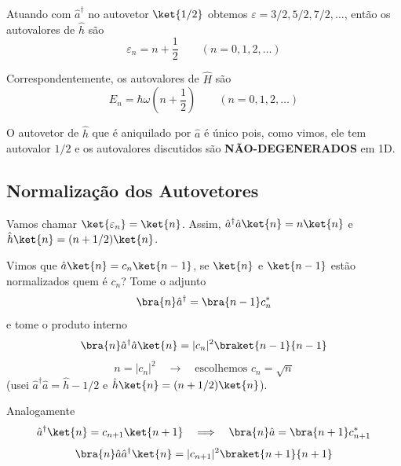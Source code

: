 Atuando com $\hat{a}^\dagger$ no autovetor $\ket{1/2}$ obtemos $\varepsilon = 3/2, 5/2, 7/2, \dots$, então os autovalores de $\hat{h}$ são
\begin{equation}
    \varepsilon_n = n + \frac{1}{2} \qquad (n = 0, 1, 2, \dots)
\label{eq:aula18_eps_n}
\end{equation}

Correspondentemente, os autovalores de $\hat{H}$ são
\begin{equation}
    \boxed{E_n = \hbar\omega\left( n + \frac{1}{2} \right) \qquad (n = 0, 1, 2, \dots)}
\label{eq:aula18_En}
\end{equation}

O autovetor de $\hat{h}$ que é aniquilado por $\hat{a}$ é único pois, como vimos, ele tem autovalor $1/2$ e os autovalores discutidos são \textbf{NÃO-DEGENERADOS} em 1D.

\subsection*{Normalização dos Autovetores}

Vamos chamar $\ket{\varepsilon_n} = \ket{n}$. Assim, $\hat{a}^\dagger\hat{a}\ket{n} = n\ket{n}$ e $\hat{h}\ket{n} = (n+1/2)\ket{n}$.

Vimos que $\hat{a}\ket{n} = c_n \ket{n-1}$, se $\ket{n}$ e $\ket{n-1}$ estão normalizados quem é $c_n$? Tome o adjunto
\begin{equation}
    \bra{n}\hat{a}^\dagger = \bra{n-1}c_n^*
\label{eq:aula18_adjunto_an}
\end{equation}
e tome o produto interno
\begin{equation}
    \bra{n}\hat{a}^\dagger\hat{a}\ket{n} = |c_n|^2 \braket{n-1}{n-1}
\label{eq:aula18_produto_interno_cn}
\end{equation}
\begin{equation}
    n = |c_n|^2 \quad \longrightarrow \quad \text{escolhemos } \boxed{c_n = \sqrt{n}}
\label{eq:aula18_cn}
\end{equation}
(usei $\hat{a}^\dagger\hat{a} = \hat{h} - 1/2$ e $\hat{h}\ket{n} = (n+1/2)\ket{n}$).

Analogamente
\begin{equation}
    \hat{a}^\dagger\ket{n} = c_{n+1}\ket{n+1} \quad \Longrightarrow \quad \bra{n}\hat{a} = \bra{n+1}c_{n+1}^*
\label{eq:aula18_adagger_n}
\end{equation}
\begin{equation}
    \bra{n}\hat{a}\hat{a}^\dagger\ket{n} = |c_{n+1}|^2\braket{n+1}{n+1}
\label{eq:aula18_produto_interno_cn1}
\end{equation}

